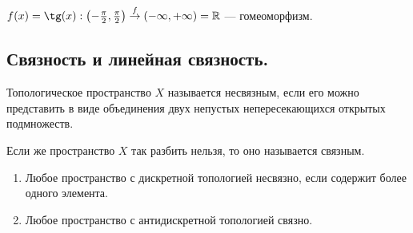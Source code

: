 \begin{example}
    $f(x) = \tg(x) : \br{-\frac{\pi}{2}, \frac{\pi}{2}} \overset{f}{\rightarrow} \br{-\infty, +\infty} = \R$ --- гомеоморфизм.  
\end{example}

\subsection{Связность и линейная связность.}

\begin{definition}
    Топологическое пространство $X$ называется несвязным, если его можно представить в виде объединения двух непустых непересекающихся открытых подмножеств.

    Если же пространство $X$ так разбить нельзя, то оно называется связным.
\end{definition}

\begin{example} %
    \begin{enumerate}
        \item Любое пространство с дискретной топологией несвязно, если содержит более одного элемента.
        \item Любое пространство с антидискретной топологией связно.
    \end{enumerate}
\end{example}

